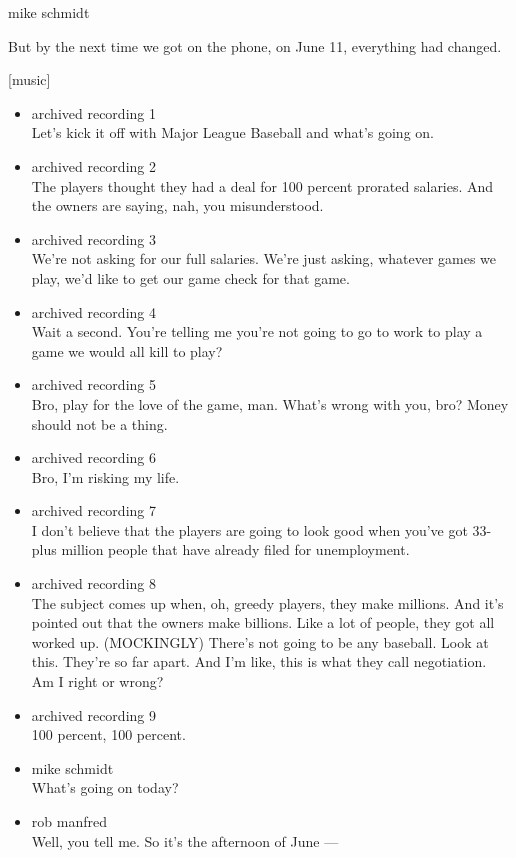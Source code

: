 mike schmidt

But by the next time we got on the phone, on June 11, everything had
changed.

{[}music{]}

\begin{itemize}
\item
  archived recording 1\\
  Let's kick it off with Major League Baseball and what's going on.
\item
  archived recording 2\\
  The players thought they had a deal for 100 percent prorated salaries.
  And the owners are saying, nah, you misunderstood.
\item
  archived recording 3\\
  We're not asking for our full salaries. We're just asking, whatever
  games we play, we'd like to get our game check for that game.
\item
  archived recording 4\\
  Wait a second. You're telling me you're not going to go to work to
  play a game we would all kill to play?
\item
  archived recording 5\\
  Bro, play for the love of the game, man. What's wrong with you, bro?
  Money should not be a thing.
\item
  archived recording 6\\
  Bro, I'm risking my life.
\item
  archived recording 7\\
  I don't believe that the players are going to look good when you've
  got 33-plus million people that have already filed for unemployment.
\item
  archived recording 8\\
  The subject comes up when, oh, greedy players, they make millions. And
  it's pointed out that the owners make billions. Like a lot of people,
  they got all worked up. (MOCKINGLY) There's not going to be any
  baseball. Look at this. They're so far apart. And I'm like, this is
  what they call negotiation. Am I right or wrong?
\item
  archived recording 9\\
  100 percent, 100 percent.
\item
  mike schmidt\\
  What's going on today?
\item
  rob manfred\\
  Well, you tell me. So it's the afternoon of June ---
\end{itemize}

